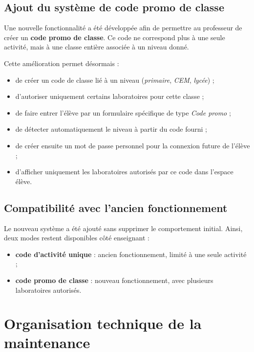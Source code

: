 \documentclass[12pt,a4paper]{report}
\begin{document}
\subsection{Ajout du système de code promo de classe}

Une nouvelle fonctionnalité a été développée afin de permettre au professeur de créer un
\textbf{code promo de classe}. Ce code ne correspond plus à une seule activité, mais à une
classe entière associée à un niveau donné.

Cette amélioration permet désormais :

\begin{itemize}[leftmargin=1.2cm]
  \item de créer un code de classe lié à un niveau (\textit{primaire}, \textit{CEM}, \textit{lycée}) ;
  \item d'autoriser uniquement certains laboratoires pour cette classe ;
  \item de faire entrer l'élève par un formulaire spécifique de type \textit{Code promo} ;
  \item de détecter automatiquement le niveau à partir du code fourni ;
  \item de créer ensuite un mot de passe personnel pour la connexion future de l'élève ;
  \item d'afficher uniquement les laboratoires autorisés par ce code dans l'espace élève.
\end{itemize}

\subsection{Compatibilité avec l'ancien fonctionnement}

Le nouveau système a été ajouté sans supprimer le comportement initial. Ainsi, deux modes
restent disponibles côté enseignant :

\begin{itemize}[leftmargin=1.2cm]
  \item \textbf{code d'activité unique} : ancien fonctionnement, limité à une seule activité ;
  \item \textbf{code promo de classe} : nouveau fonctionnement, avec plusieurs laboratoires autorisés.
\end{itemize}

\section{Organisation technique de la maintenance}
\end{document}
